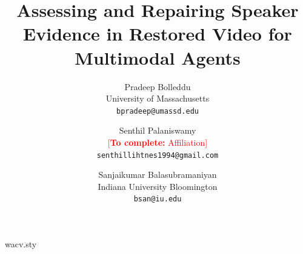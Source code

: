 \begin{filecontents*}{wacv.sty}




\end{filecontents*}
\documentclass[10pt,twocolumn,letterpaper]{article}
\usepackage[T1]{fontenc}
\usepackage[review,algorithms]{wacv}
\usepackage{array,tabularx,microtype}
\usepackage[pagebackref,breaklinks,hidelinks]{hyperref}
\def\confName{WVAQ}
\def\confYear{2027}
\def\wacvPaperID{TBD}
\ClearShipoutPicture
{}

\newcommand{\todoexp}[1]{\textcolor{red}{[\textbf{To complete:} #1]}}
\newcommand{\pending}{\textcolor{red}{Pending}}
\newcommand{\method}{Evidence-Preserving Repair}
\newcommand{\placeholder}[2]{\fbox{\parbox[c][#1][c]{0.94\linewidth}{\centering\small #2}}}
\title{Assessing and Repairing Speaker Evidence in Restored Video for Multimodal Agents}
\author{Pradeep Bolleddu\\University of Massachusetts\\{\small\texttt{bpradeep@umassd.edu}}
\and Senthil Palaniswamy\\\todoexp{Affiliation}\\{\small\texttt{senthillihtnes1994@gmail.com}}
\and Sanjaikumar Balasubramaniyan\\Indiana University Bloomington\\{\small\texttt{bsan@iu.edu}}}
\date{}


